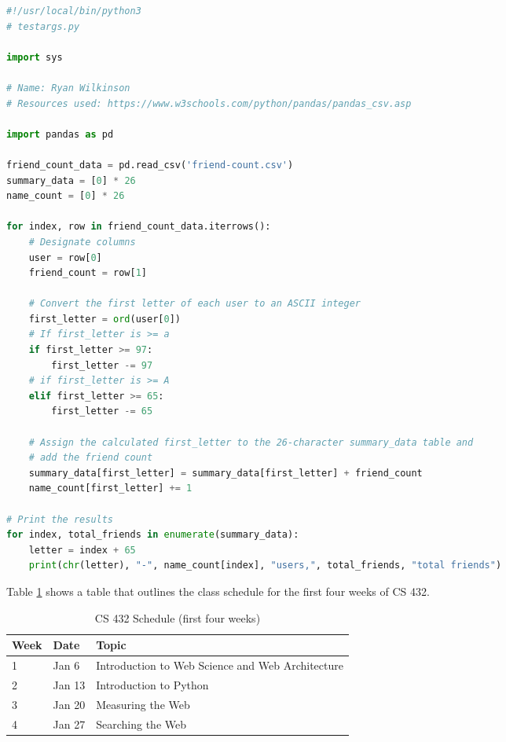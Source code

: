 \documentclass[12pt]{article}
\begin{document}
\begin{lstlisting}[language=Python, caption=Python code extracted from EC 0.1, label=lst:copy]
#!/usr/local/bin/python3
# testargs.py

import sys

# Name: Ryan Wilkinson
# Resources used: https://www.w3schools.com/python/pandas/pandas_csv.asp

import pandas as pd

friend_count_data = pd.read_csv('friend-count.csv')
summary_data = [0] * 26
name_count = [0] * 26

for index, row in friend_count_data.iterrows():
    # Designate columns
    user = row[0]
    friend_count = row[1]

    # Convert the first letter of each user to an ASCII integer
    first_letter = ord(user[0])
    # If first_letter is >= a
    if first_letter >= 97:
        first_letter -= 97
    # if first_letter is >= A
    elif first_letter >= 65:
        first_letter -= 65

    # Assign the calculated first_letter to the 26-character summary_data table and
    # add the friend count
    summary_data[first_letter] = summary_data[first_letter] + friend_count
    name_count[first_letter] += 1

# Print the results
for index, total_friends in enumerate(summary_data):
    letter = index + 65
    print(chr(letter), "-", name_count[index], "users,", total_friends, "total friends")
\end{lstlisting}

Table \ref{tbl:simple} shows a table that outlines the class schedule for the first four weeks of CS 432.

\begin{table}[h]
\centering
\caption{CS 432 Schedule (first four weeks)}
\label{tbl:simple}
\begin{tabular}{|l|l|l|}
\hline
\textbf{Week} & \textbf{Date} & \textbf{Topic} \\ \hline \hline
1 & Jan 6 & Introduction to Web Science and Web Architecture \\ \hline
2 & Jan 13 & Introduction to Python \\ \hline
3 & Jan 20 & Measuring the Web \\ \hline
4 & Jan 27 & Searching the Web \\ \hline
\end{tabular}
\end{table}
\end{document}
